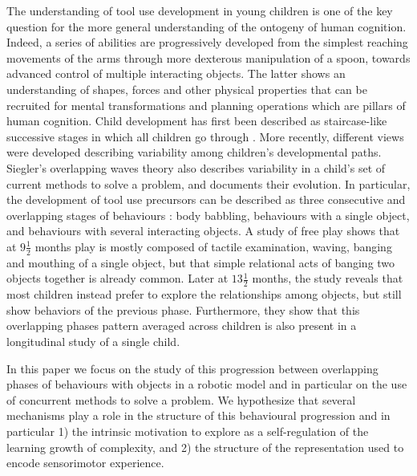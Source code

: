 \documentclass[10pt,letterpaper]{article}
\begin{document}
	
	The understanding of tool use development in young children is one of the key question for the more general understanding of the ontogeny of human cognition.
	Indeed, a series of abilities are progressively developed from the simplest reaching movements of the arms through more dexterous manipulation of a spoon, towards advanced control of multiple interacting objects.
	The latter shows an understanding of shapes, forces and other physical properties that can be recruited for mental transformations and planning operations which are pillars of human cognition.
	Child development has first been described as staircase-like successive stages in which all children go through \cite{piaget1952origins}.
	More recently, different views were developed describing variability among children's developmental paths. 
	Siegler's overlapping waves theory \cite{siegler1996emerging} also describes variability in a child's set of current methods to solve a problem, and documents their evolution. 
	In particular, the development of tool use precursors can be described as three consecutive and overlapping stages of behaviours \cite{guerin2013survey}: 
	body babbling, behaviours with a single object, and behaviours with several interacting objects.
	A study of free play \cite{Zelazo198095} shows that at $9\frac{1}{2}$ months play is mostly composed of tactile examination, waving, banging and mouthing of a single object, 
	but that simple relational acts of banging two objects together is already common.
	Later at $13\frac{1}{2}$ months, the study reveals that most children instead prefer to explore the relationships
	among objects, but still show behaviors of the previous phase. 
	Furthermore, they show that this overlapping phases pattern averaged across children is also present in a longitudinal study of a single child.
	
	In this paper we focus on the study of this progression between overlapping phases of behaviours with objects in a robotic model and in particular on the use of concurrent methods to solve a problem.	
	We hypothesize that several mechanisms play a role in the structure of this behavioural progression and in particular 
	1) the intrinsic motivation to explore as a self-regulation of the learning growth of complexity, and 
	2) the structure of the representation used to encode sensorimotor experience.	
	
\end{document}
